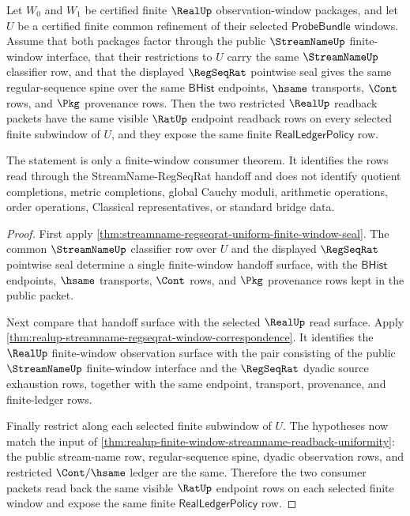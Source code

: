 \begin{theorem}
\label{thm:realup-streamname-regseqrat-uniform-window-readback}
Let $W_0$ and $W_1$ be certified finite $\RealUp$ observation-window packages,
and let $U$ be a certified finite common refinement of their selected
$\mathsf{ProbeBundle}$ windows. Assume that both packages factor through the
public $\StreamNameUp$ finite-window interface, that their restrictions to $U$
carry the same $\StreamNameUp$ classifier row, and that the displayed
$\RegSeqRat$ pointwise seal gives the same regular-sequence spine over the
same $\mathsf{BHist}$ endpoints, $\hsame$ transports, $\Cont$ rows, and
$\Pkg$ provenance rows. Then the two restricted $\RealUp$ readback packets have
the same visible $\RatUp$ endpoint readback rows on every selected finite
subwindow of $U$, and they expose the same finite
$\mathsf{RealLedgerPolicy}$ row.

The statement is only a finite-window consumer theorem. It identifies the rows
read through the StreamName-RegSeqRat handoff and does not identify quotient
completions, metric completions, global Cauchy moduli, arithmetic operations,
order operations, Classical representatives, or standard bridge data.
\end{theorem}
\begin{proof}
First apply
\autoref{thm:streamname-regseqrat-uniform-finite-window-seal}. The common
$\StreamNameUp$ classifier row over $U$ and the displayed $\RegSeqRat$
pointwise seal determine a single finite-window handoff surface, with the
$\mathsf{BHist}$ endpoints, $\hsame$ transports, $\Cont$ rows, and $\Pkg$
provenance rows kept in the public packet.

Next compare that handoff surface with the selected $\RealUp$ read surface.
Apply \autoref{thm:realup-streamname-regseqrat-window-correspondence}. It
identifies the $\RealUp$ finite-window observation surface with the pair
consisting of the public $\StreamNameUp$ finite-window interface and the
$\RegSeqRat$ dyadic source exhaustion rows, together with the same endpoint,
transport, provenance, and finite-ledger rows.

Finally restrict along each selected finite subwindow of $U$. The hypotheses
now match the input of
\autoref{thm:realup-finite-window-streamname-readback-uniformity}: the public
stream-name row, regular-sequence spine, dyadic observation rows, and
restricted $\Cont/\hsame$ ledger are the same. Therefore the two consumer
packets read back the same visible $\RatUp$ endpoint rows on each selected
finite window and expose the same finite $\mathsf{RealLedgerPolicy}$ row.
\end{proof}

